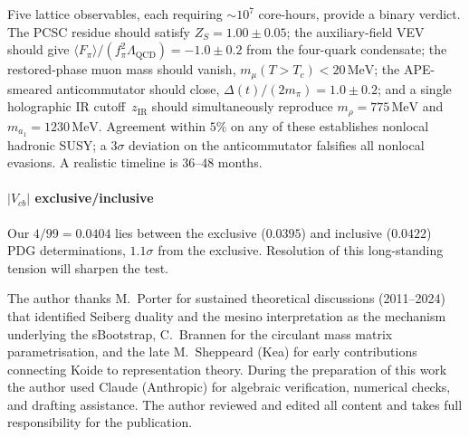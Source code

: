 \documentclass[aps,prd,twocolumn,showpacs,preprintnumbers,superscriptaddress]{revtex4-2}
\newcommand{\MeV}{\,\mathrm{MeV}}
\newcommand{\Lqcd}{\Lambda_{\mathrm{QCD}}}
\begin{document}
Five lattice observables, each requiring $\sim 10^7$ core-hours,
provide a binary verdict.
The PCSC residue should satisfy $Z_S = 1.00 \pm 0.05$;
the auxiliary-field VEV should give
$\langle F_\pi\rangle/(f_\pi^2\Lqcd) = -1.0 \pm 0.2$
from the four-quark condensate;
the restored-phase muon mass should vanish,
$m_\mu(T > T_c) < 20\MeV$;
the APE-smeared anticommutator should close,
$\Delta(t)/(2m_\pi) = 1.0 \pm 0.2$;
and a single holographic IR cutoff~$z_{\mathrm{IR}}$ should
simultaneously reproduce $m_\rho = 775\MeV$ and
$m_{a_1} = 1230\MeV$.
Agreement within $5\%$ on any of these establishes nonlocal
hadronic SUSY; a $3\sigma$ deviation on the anticommutator
falsifies all nonlocal evasions.
A realistic timeline is $36$--$48$ months.

\paragraph{$|V_{cb}|$ exclusive/inclusive}

Our $4/99 = 0.0404$ lies between the exclusive ($0.0395$)
and inclusive ($0.0422$) PDG determinations, $1.1\sigma$ from
the exclusive.  Resolution of this long-standing tension
will sharpen the test.

\begin{acknowledgments}
The author thanks M.~Porter for sustained theoretical
discussions (2011--2024) that identified Seiberg duality and
the mesino interpretation as the mechanism underlying the
sBootstrap, C.~Brannen for the circulant mass matrix
parametrisation, and the late M.~Sheppeard (Kea) for
early contributions connecting Koide to representation
theory.
During the preparation of this work the author used Claude
(Anthropic) for algebraic verification, numerical checks,
and drafting assistance.
The author reviewed and edited all content and takes full
responsibility for the publication.
\end{acknowledgments}
\end{document}
